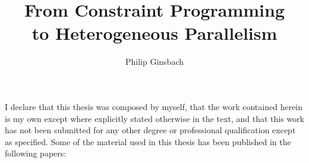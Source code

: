 \documentclass[phd,icsa,twoside,logo,11pt]{infthesis}
\title{From Constraint Programming\\to Heterogeneous Parallelism}
\author{Philip Ginsbach}
\begin{document}
\begin{preliminary}
\maketitle
\begin{acknowledgements}
%
%
%
\end{acknowledgements}
\begin{declaration}
    I declare that this thesis was composed by myself, that the work contained
    herein is my own except where explicitly stated otherwise in the text, and
    that this work has not been submitted for any other degree or professional
    qualification except as specified.
    Some of the material used in this thesis has been published in the following
    papers:


\end{declaration}
\end{preliminary}
\end{document}
